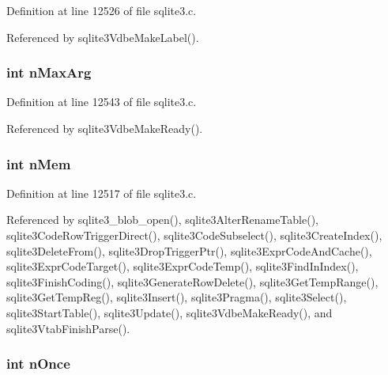 Definition at line 12526 of file sqlite3.\+c.



Referenced by sqlite3\+Vdbe\+Make\+Label().

\hypertarget{struct_parse_a6ccdb6f869078cb97158ed463cdfe3e8}{}
\subsubsection[{n\+Max\+Arg}]{\setlength{\rightskip}{0pt plus 5cm}int n\+Max\+Arg}\label{struct_parse_a6ccdb6f869078cb97158ed463cdfe3e8}


Definition at line 12543 of file sqlite3.\+c.



Referenced by sqlite3\+Vdbe\+Make\+Ready().

\hypertarget{struct_parse_a857d199d972b4d3864ce420c143508e4}{}
\subsubsection[{n\+Mem}]{\setlength{\rightskip}{0pt plus 5cm}int n\+Mem}\label{struct_parse_a857d199d972b4d3864ce420c143508e4}


Definition at line 12517 of file sqlite3.\+c.



Referenced by sqlite3\+\_\+blob\+\_\+open(), sqlite3\+Alter\+Rename\+Table(), sqlite3\+Code\+Row\+Trigger\+Direct(), sqlite3\+Code\+Subselect(), sqlite3\+Create\+Index(), sqlite3\+Delete\+From(), sqlite3\+Drop\+Trigger\+Ptr(), sqlite3\+Expr\+Code\+And\+Cache(), sqlite3\+Expr\+Code\+Target(), sqlite3\+Expr\+Code\+Temp(), sqlite3\+Find\+In\+Index(), sqlite3\+Finish\+Coding(), sqlite3\+Generate\+Row\+Delete(), sqlite3\+Get\+Temp\+Range(), sqlite3\+Get\+Temp\+Reg(), sqlite3\+Insert(), sqlite3\+Pragma(), sqlite3\+Select(), sqlite3\+Start\+Table(), sqlite3\+Update(), sqlite3\+Vdbe\+Make\+Ready(), and sqlite3\+Vtab\+Finish\+Parse().

\hypertarget{struct_parse_a8b26e5a5e9547ab221d19c9e5c56f174}{}
\subsubsection[{n\+Once}]{\setlength{\rightskip}{0pt plus 5cm}int n\+Once}\label{struct_parse_a8b26e5a5e9547ab221d19c9e5c56f174}


